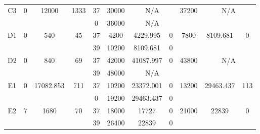 \begin{sidewaystable}
\begin{tabular}{c||c|c|c||c|c|c|c||c|c|c}
         &
        
      \\
      \hline
      \multirow{2}{*}{C3} &
      \multirow{2}{*}{0} &
      \multirow{2}{*}{12000} &
      \multirow{2}{*}{1333} &
      37 &
      30000 &
        \multicolumn{2}{|c||}{N/A} &
      \multirow{2}{*}{37200} &
        \multicolumn{2}{c}{\multirow{2}{*}{N/A}}
      \\
      \cline{5-8}
       &
       &
       &
       &
      0 &
      36000 &
        \multicolumn{2}{|c||}{N/A} &
      
        
      \\
      \hline
      \multirow{2}{*}{D1} &
      \multirow{2}{*}{0} &
      \multirow{2}{*}{540} &
      \multirow{2}{*}{45} &
      37 &
      4200 &
        4229.995 &
        0 &
      \multirow{2}{*}{7800} &
        \multirow{2}{*}{8109.681} &
        \multirow{2}{*}{0}
      \\
      \cline{5-8}
       &
       &
       &
       &
      39 &
      10200 &
        8109.681 &
        0 &
      
         &
        
      \\
      \hline
      \multirow{2}{*}{D2} &
      \multirow{2}{*}{0} &
      \multirow{2}{*}{840} &
      \multirow{2}{*}{69} &
      37 &
      42000 &
        41087.997 &
        0 &
      \multirow{2}{*}{43800} &
        \multicolumn{2}{c}{\multirow{2}{*}{N/A}}
      \\
      \cline{5-8}
       &
       &
       &
       &
      39 &
      48000 &
        \multicolumn{2}{|c||}{N/A} &
      
        
      \\
      \hline
      \multirow{2}{*}{E1} &
      \multirow{2}{*}{0} &
      \multirow{2}{*}{17082.853} &
      \multirow{2}{*}{711} &
      37 &
      10200 &
        23372.001 &
        0 &
      \multirow{2}{*}{13200} &
        \multirow{2}{*}{29463.437} &
        \multirow{2}{*}{113}
      \\
      \cline{5-8}
       &
       &
       &
       &
      0 &
      19200 &
        29463.437 &
        0 &
      
         &
        
      \\
      \hline
      \multirow{2}{*}{E2} &
      \multirow{2}{*}{7} &
      \multirow{2}{*}{1680} &
      \multirow{2}{*}{70} &
      37 &
      18000 &
        17727 &
        0 &
      \multirow{2}{*}{21000} &
        \multirow{2}{*}{22839} &
        \multirow{2}{*}{0}
      \\
      \cline{5-8}
       &
       &
       &
       &
      39 &
      26400 &
        22839 &
        0 &
      

\end{tabular}
\end{sidewaystable}

